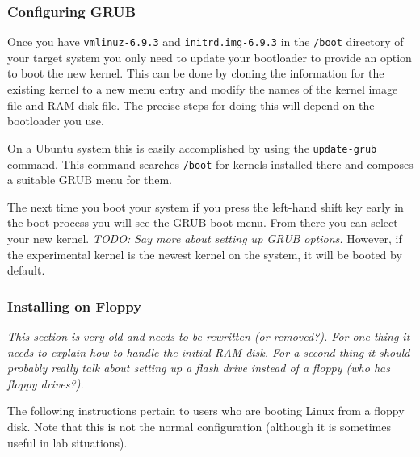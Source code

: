 \documentclass{article}
\newcommand{\command}[1]{\texttt{#1}}
\newcommand{\filename}[1]{\texttt{#1}}
\newcommand{\todo}[1]{\textit{TODO: #1}}
\begin{document}
\subsubsection{Configuring GRUB}

Once you have \filename{vmlinuz-6.9.3} and \filename{initrd.img-6.9.3} in the \filename{/boot}
directory of your target system you only need to update your bootloader to provide an option to
boot the new kernel. This can be done by cloning the information for the existing kernel to a
new menu entry and modify the names of the kernel image file and RAM disk file. The precise
steps for doing this will depend on the bootloader you use.

On a Ubuntu system this is easily accomplished by using the \command{update-grub} command. This
command searches \filename{/boot} for kernels installed there and composes a suitable GRUB menu
for them.

The next time you boot your system if you press the left-hand shift key early in the boot
process you will see the GRUB boot menu. From there you can select your new kernel. \todo{Say
more about setting up GRUB options.} However, if the experimental kernel is the newest kernel on
the system, it will be booted by default.

\subsubsection{Installing on Floppy}

\textit{This section is very old and needs to be rewritten (or removed?). For one thing it needs
  to explain how to handle the initial RAM disk. For a second thing it should probably really
  talk about setting up a flash drive instead of a floppy (who has floppy drives?).}

The following instructions pertain to users who are booting Linux from a floppy disk. Note that
this is not the normal configuration (although it is sometimes useful in lab situations).
\end{document}
